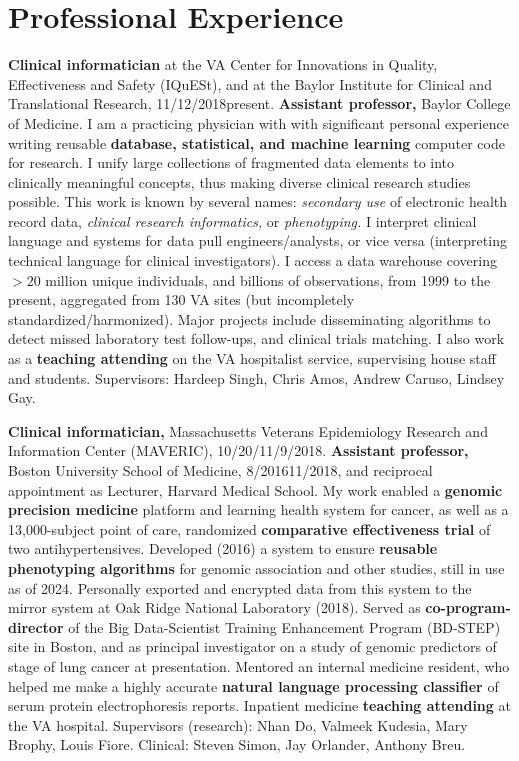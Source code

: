 \documentclass[10pt]{article}
\begin{document}
\section*{Professional Experience} %

\textbf{Clinical informatician} at the VA Center for Innovations in
Quality, Effectiveness and Safety (IQuESt), and at the Baylor
Institute for Clinical and Translational Research,
11/12/2018\ndash{}present. \textbf{Assistant professor,} Baylor
College of Medicine. I am a practicing physician with with significant
personal experience writing reusable \textbf{database, statistical,
  and machine learning} computer code for research. I unify large
collections of fragmented data elements to into clinically meaningful
concepts, thus making diverse clinical research studies possible. This
work is known by several names: \emph{secondary use} of electronic
health record data, \emph{clinical research informatics,} or
\emph{phenotyping.} I interpret clinical language and systems for data
pull engineers/analysts, or vice versa (interpreting technical
language for clinical investigators). I access a data warehouse
covering $> 20$ million unique individuals, and billions of
observations, from 1999 to the present, aggregated from 130 VA sites
(but incompletely standardized/harmonized). Major projects include
disseminating algorithms to detect missed laboratory test follow-ups,
and clinical trials matching. I also work as a \textbf{teaching
  attending} on the VA hospitalist service, supervising house staff
and students. Supervisors: Hardeep Singh, Chris Amos, Andrew Caruso,
Lindsey Gay.

\textbf{Clinical informatician,} Massachusetts Veterans Epidemiology
Research and Information Center (MAVERIC),
10/20/\ndash{}11/9/2018. \textbf{Assistant
  professor,} Boston University School of Medicine,
8/2016\ndash{}11/2018, and reciprocal appointment as Lecturer, Harvard
Medical School. My work enabled a \textbf{genomic precision medicine}
platform and learning health system for cancer, as well as a
13,000-subject point of care, randomized \textbf{comparative
  effectiveness trial} of two antihypertensives. Developed (2016) a
system to ensure \textbf{reusable phenotyping algorithms} for genomic
association and other studies, still in use as of 2024. Personally
exported and encrypted data from this system to the mirror system at
Oak Ridge National Laboratory (2018). Served as \textbf{co-program-director} of
the Big Data-Scientist Training Enhancement Program (BD-STEP) site in
Boston, and as principal investigator on a study of genomic predictors
of stage of lung cancer at presentation. Mentored an internal
medicine resident, who helped me make a highly accurate
\textbf{natural language processing classifier} of serum protein
electrophoresis reports. Inpatient medicine \textbf{teaching
  attending} at the VA hospital. Supervisors (research): Nhan Do,
Valmeek Kudesia, Mary Brophy, Louis Fiore. Clinical: Steven Simon, Jay
Orlander, Anthony Breu.
\end{document}
